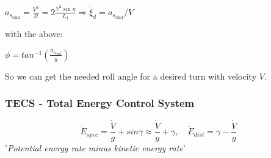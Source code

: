 \documentclass[fontsize=6pt,DIV=calc,a4paper,ngerman]{scrartcl}
\begin{document}
\begin{multicols*}{4}
\begin{minipage}{0.5\linewidth}
		$a_{s_{\text{cmd}}}= \frac{V^2}{R}= 2\frac{V^2 \sin\eta}{L_1} 
		\Rightarrow \dot{\xi}_d=a_{s_{\text{cmd}}}/V$

		\smallskip
		with the above:

		$\displaystyle \phi = tan^{-1}\left(\frac{a_{s_{\text{cmd}}}}{g}\right)$

		So we can get the needed roll angle for a desired turn with velocity $V$.
	\end{minipage}


	\subsubsection{TECS - Total Energy Control System}

	$$\dot{E}_{spec}= \frac{\dot{V}}{g}+sin\gamma \approx \frac{\dot{V}}{g}+\gamma, \quad \dot{E}_{dist} = \gamma - \frac{\dot{V}}{g}
	$$
	'\textit{Potential energy rate minus kinetic energy rate}'






\end{multicols*}
\end{document}

